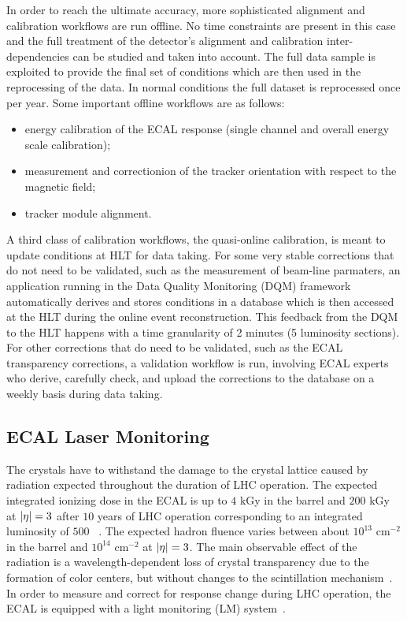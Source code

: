 In order to reach the ultimate accuracy, more sophisticated
alignment and calibration workflows are run offline. No time
constraints are present in this case and the full treatment of the
detector’s alignment and calibration inter-dependencies can be
studied and taken into account. The full data sample is exploited to
provide the final set of conditions which are then used in the
reprocessing of the data. In normal conditions the full dataset is
reprocessed once per year. Some important offline workflows are as follows:
\begin{itemize}
\item energy calibration of the ECAL response (single channel and overall energy scale calibration);
\item measurement and correctionion of the tracker orientation with respect to the magnetic field;
\item tracker module alignment.
\end{itemize}

A third class of calibration workflows, the quasi-online calibration,
is meant to update conditions at HLT for data taking. %
For some very stable corrections that do not need to be validated, such as the measurement of beam-line
parmaters, an application running in the Data Quality Monitoring (DQM)
framework~\cite{DeGuio:2014taa} automatically derives and stores conditions in a database which is
then accessed at the HLT during the online event
reconstruction. This feedback from the DQM to the HLT happens with a
time granularity of 2 minutes (5 luminosity sections).
For other corrections that do need to be validated, such as the ECAL transparency
corrections, a validation workflow is run, involving ECAL experts who
derive, carefully check, and upload the corrections to the database on
a weekly basis during data taking.


\subsection{ECAL Laser Monitoring}

The crystals have to withstand the damage to the crystal
lattice caused by radiation expected throughout the duration of LHC operation. The
expected integrated ionizing dose in the ECAL is up to $4$ \unit{kGy} in the
barrel and $200$ \unit{kGy} at $\lvert \eta \rvert = 3$ after $10$ years of LHC operation
corresponding to an integrated luminosity of $500$ \fbinv~\cite{CMSECALTDR}. The
expected hadron fluence varies between about $10^{13}$ cm$^{-2}$ in the barrel
and $10^{14}$ cm$^{-2}$ at $\lvert \eta \rvert = 3$. The main observable effect of the radiation
is a wavelength-dependent loss of crystal transparency due to the
formation of color centers, but without changes to the scintillation
mechanism~\cite{Adzic:2009aa}. In order to measure and correct for
response change during LHC operation, the ECAL is equipped with a
light monitoring (LM) system~\cite{Anfreville:2007zz,Zhang:2005ip}. 

